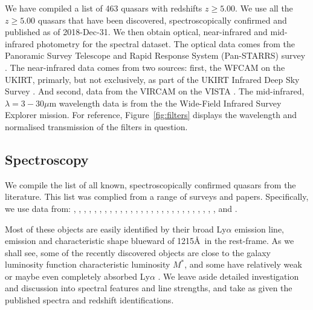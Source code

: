\documentclass[usenatbib]{mnras}
\begin{document}
We have compiled a list of 463 quasars with redshifts $z\geq5.00$. We use all the $z\geq5.00$ quasars that have been discovered, spectroscopically confirmed and published as of 2018-Dec-31. We then obtain optical, near-infrared and mid-infrared photometry for the spectral dataset. The optical data comes from the Panoramic Survey Telescope and Rapid Response System (Pan-STARRS) survey \citep{Chambers2016}. The near-infrared data comes from two sources: first, the WFCAM \citep[][]{Casali2007} on the UKIRT, primarly, but not exclusively, as part of the UKIRT Infrared Deep Sky Survey \citep[UKIDSS; ][]{Lawrence2007}.  And second, data from the VIRCAM on the VISTA \citep[][]{Emerson2006, Dalton2006}. The mid-infrared, $\lambda=3-30\mu$m wavelength data is from the the Wide-Field Infrared Survey Explorer \citep[WISE;][]{Wright2010, Cutri2013} mission. 
For reference, Figure~\ref{fig:filters} displays the wavelength and normalised transmission of the filters in question. 

\subsection{Spectroscopy} 
We compile the list of all known, spectroscopically confirmed
quasars from the literature.  This list was complied from a range of
surveys and papers.  Specifically, we use data from:
\citet{Banados2014, Banados2016, Banados2018}, 
\citet{Becker2015}, 
\citet{Calura2014}, 
\citet{Carilli2007, Carilli2010}, 
\citet{Carnall2015}, 
\citet{Cool2006}, 
\citet{DeRosa2011}, 
\citet{Fan2000, Fan2001c, Fan2003, Fan2004, Fan2006, Fan2018}, 
\citet{Goto2006}, 
\citet{Ikeda2017}, 
\citet{Jiang2008, Jiang2009, Jiang2015, Jiang2016},   
\citet{Kashikawa2015}, 
\citet{Koptelova2017}, 
\citet{Kim2015, Kim2018},  
\citet{Kurk2007, Kurk2009}, 
\citet{Leipski2014}, 
\citet{Mahabal2005}, 
\citet{Matsuoka2016,  Matsuoka2018a, Matsuoka2018b},   
\citet{Mazzucchelli2017}, 
\citet{Morganson2012}, 
\citet{Mortlock2009, Mortlock2011},
\citet{McGreer2006, McGreer2013},  
\citet{Reed2015, Reed2017}, 
\citet{Stern2007},  
\citet{Tang2017}, 
\citet{Venemans2007, Venemans2012, Venemans2013, Venemans2015a, Venemans2015b, Venemans2016},
\citet{WangF2016, WangF2017, WangF2018a, WangF2018b},
\citet{Willott2007, Willott2009, Willott2010a, Willott2013b, Willott2015}, 
\citet{Wu2015} 
\citet{YangJ2018a, YangJ2018b}  
and 
\citet{Zeimann2011}. 

Most of these objects are easily identified by their broad Ly$\alpha$
emission line, \nv emission and characteristic shape blueward of
1215\AA\ in the rest-frame. As we shall see, some of the recently
discovered objects are close to the galaxy luminosity function
characteristic luminosity $M^{*}$, and some have relatively weak or
maybe even completely absorbed Ly$\alpha$ \citep[e.g. Figures 7 and 10
in][]{Banados2016}. We leave aside detailed investigation and
discussion into spectral features and line strengths, and take as
given the published spectra and redshift identifications.
\end{document}
